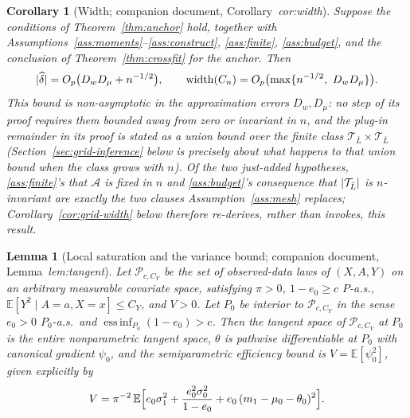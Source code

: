 \documentclass[11pt]{article}
\theoremstyle{plain}
\newtheorem{lemma}[theorem]{Lemma}
\newtheorem{corollary}[theorem]{Corollary}
\theoremstyle{definition}
\theoremstyle{remark}
\newcommand{\E}{\mathbb{E}}
\newcommand{\cA}{\mathcal{A}}
\newcommand{\cT}{\mathcal{T}}
\newcommand{\cP}{\mathcal{P}}
\newcommand{\ez}{e_0}
\newcommand{\mz}{\mu_0}
\newcommand{\Dw}{D_w}
\newcommand{\Dm}{D_\mu}
\DeclarePairedDelimiter{\abs}{\lvert}{\rvert}
\DeclarePairedDelimiter{\card}{\lvert}{\rvert}
\begin{document}
\begin{corollary}[Width; companion document, Corollary~\emph{cor:width}]
\label{cor:width}
Suppose the conditions of Theorem~\ref{thm:anchor} hold, together with
Assumptions~\ref{ass:moments}--\ref{ass:construct}, \ref{ass:finite},
\ref{ass:budget}, and the conclusion of Theorem~\ref{thm:crossfit} for the
anchor. Then
\[
  \abs{\widehat\delta}=O_p\bigl(\Dw\Dm+n^{-1/2}\bigr),
  \qquad
  \mathrm{width}(C_n)=O_p\bigl(\max\{n^{-1/2},\ \Dw\Dm\}\bigr).
\]
This bound is non-asymptotic in the approximation errors $\Dw,\Dm$: no step
of its proof requires them bounded away from zero or invariant in $n$, and
the plug-in remainder in its proof is stated as a union bound over the
finite class $\cT_{\bar L}\times\cT_{\bar L}$ (Section~\ref{sec:grid-inference}
below is precisely about what happens to that union bound when the class
grows with $n$). Of the two just-added hypotheses, \ref{ass:finite}'s that
$\cA$ is fixed in $n$ and \ref{ass:budget}'s consequence that
$\card{\cT_{\bar L}}$ is $n$-invariant are exactly the two clauses
Assumption~\ref{ass:mesh} replaces; Corollary~\ref{cor:grid-width} below
therefore re-derives, rather than invokes, this result.
\end{corollary}

\begin{lemma}[Local saturation and the variance bound; companion document,
Lemma~\emph{lem:tangent}]\label{lem:tangent}
Let $\cP_{c,C_Y}$ be the set of observed-data laws of $(X,A,Y)$ on an
arbitrary measurable covariate space, satisfying $\pi>0$, $1-\ez\ge c$
$P$-a.s., $\E[Y^2\mid A=a,X=x]\le C_Y$, and $V>0$. Let $P_0$ be interior to
$\cP_{c,C_Y}$ in the sense $\ez>0$ $P_0$-a.s.\ and
$\operatorname*{ess\,inf}_{P_0}(1-\ez)>c$. Then the tangent space of
$\cP_{c,C_Y}$ at $P_0$ is the entire nonparametric tangent space, $\theta$
is pathwise differentiable at $P_0$ with canonical gradient $\psi_0$, and
the semiparametric efficiency bound is $V=\E[\psi_0^2]$, given explicitly by
\begin{equation}\label{eq:vdecomp}
  V=\pi^{-2}\,\E\Bigl[\ez\sigma_1^2
   +\frac{\ez^2\sigma_0^2}{1-\ez}
   +\ez\,(m_1-\mz-\theta_0)^2\Bigr].
\end{equation}
\end{lemma}
\end{document}
